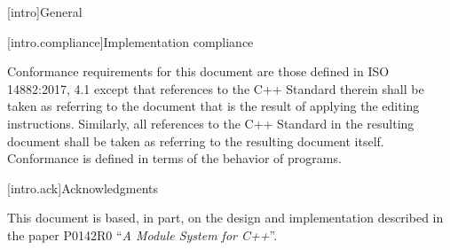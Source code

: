 
[intro]{General}


[intro.compliance]{Implementation compliance}

\pnum
Conformance requirements for this document are those 
defined in ISO 14882:2017, 4.1
except that references to the C++ Standard therein shall
be taken as referring to the document that is the result
of applying the editing instructions.  Similarly, all references
to the C++ Standard in the resulting document shall be taken
as referring to the resulting document itself.
\enternote 
Conformance is defined in terms of the behavior of programs.
\exitnote








[intro.ack]{Acknowledgments}


\pnum
This document is based, in part, on the design and implementation
described in the paper P0142R0 ``\emph{A Module System for C++}''.
